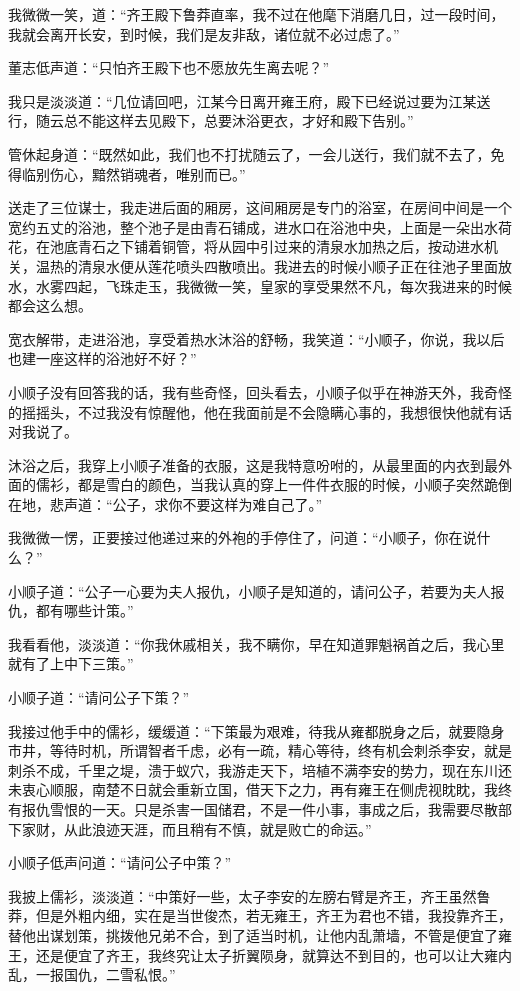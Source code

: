 我微微一笑，道：“齐王殿下鲁莽直率，我不过在他麾下消磨几日，过一段时间，我就会离开长安，到时候，我们是友非敌，诸位就不必过虑了。”

董志低声道：“只怕齐王殿下也不愿放先生离去呢？”

我只是淡淡道：“几位请回吧，江某今日离开雍王府，殿下已经说过要为江某送行，随云总不能这样去见殿下，总要沐浴更衣，才好和殿下告别。”

管休起身道：“既然如此，我们也不打扰随云了，一会儿送行，我们就不去了，免得临别伤心，黯然销魂者，唯别而已。”

送走了三位谋士，我走进后面的厢房，这间厢房是专门的浴室，在房间中间是一个宽约五丈的浴池，整个池子是由青石铺成，进水口在浴池中央，上面是一朵出水荷花，在池底青石之下铺着铜管，将从园中引过来的清泉水加热之后，按动进水机关，温热的清泉水便从莲花喷头四散喷出。我进去的时候小顺子正在往池子里面放水，水雾四起，飞珠走玉，我微微一笑，皇家的享受果然不凡，每次我进来的时候都会这么想。

宽衣解带，走进浴池，享受着热水沐浴的舒畅，我笑道：“小顺子，你说，我以后也建一座这样的浴池好不好？”

小顺子没有回答我的话，我有些奇怪，回头看去，小顺子似乎在神游天外，我奇怪的摇摇头，不过我没有惊醒他，他在我面前是不会隐瞒心事的，我想很快他就有话对我说了。

沐浴之后，我穿上小顺子准备的衣服，这是我特意吩咐的，从最里面的内衣到最外面的儒衫，都是雪白的颜色，当我认真的穿上一件件衣服的时候，小顺子突然跪倒在地，悲声道：“公子，求你不要这样为难自己了。”

我微微一愣，正要接过他递过来的外袍的手停住了，问道：“小顺子，你在说什么？”

小顺子道：“公子一心要为夫人报仇，小顺子是知道的，请问公子，若要为夫人报仇，都有哪些计策。”

我看看他，淡淡道：“你我休戚相关，我不瞒你，早在知道罪魁祸首之后，我心里就有了上中下三策。”

小顺子道：“请问公子下策？”

我接过他手中的儒衫，缓缓道：“下策最为艰难，待我从雍都脱身之后，就要隐身市井，等待时机，所谓智者千虑，必有一疏，精心等待，终有机会刺杀李安，就是刺杀不成，千里之堤，溃于蚁穴，我游走天下，培植不满李安的势力，现在东川还未衷心顺服，南楚不日就会重新立国，借天下之力，再有雍王在侧虎视眈眈，我终有报仇雪恨的一天。只是杀害一国储君，不是一件小事，事成之后，我需要尽散部下家财，从此浪迹天涯，而且稍有不慎，就是败亡的命运。”

小顺子低声问道：“请问公子中策？”

我披上儒衫，淡淡道：“中策好一些，太子李安的左膀右臂是齐王，齐王虽然鲁莽，但是外粗内细，实在是当世俊杰，若无雍王，齐王为君也不错，我投靠齐王，替他出谋划策，挑拨他兄弟不合，到了适当时机，让他内乱萧墙，不管是便宜了雍王，还是便宜了齐王，我终究让太子折翼陨身，就算达不到目的，也可以让大雍内乱，一报国仇，二雪私恨。”

